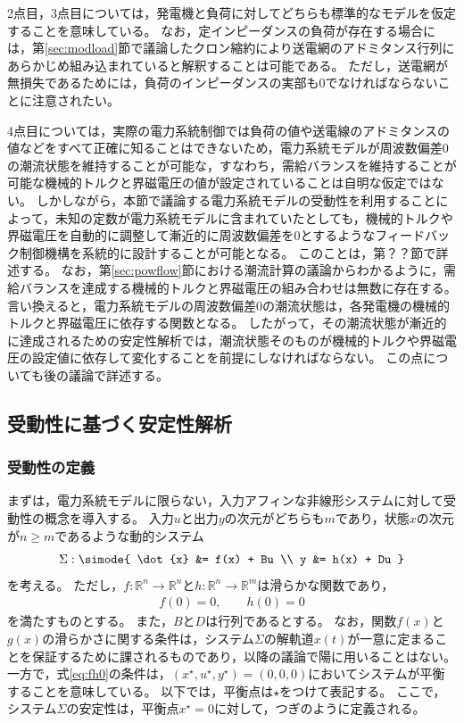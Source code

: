 \documentclass[tombow,dvipdfmx]{corona-a5}
\begin{document}
2点目，3点目については，発電機と負荷に対してどちらも標準的なモデルを仮定することを意味している。
なお，定インピーダンスの負荷が存在する場合には，第\ref{sec:modload}節で議論したクロン縮約により送電網のアドミタンス行列にあらかじめ組み込まれていると解釈することは可能である。
ただし，送電網が無損失であるためには，負荷のインピーダンスの実部も0でなければならないことに注意されたい。

4点目については，実際の電力系統制御では負荷の値や送電線のアドミタンスの値などをすべて正確に知ることはできないため，電力系統モデルが周波数偏差0の潮流状態を維持することが可能な，すなわち，需給バランスを維持することが可能な機械的トルクと界磁電圧の値が設定されていることは自明な仮定ではない。
しかしながら，本節で議論する電力系統モデルの受動性を利用することによって，未知の定数が電力系統モデルに含まれていたとしても，機械的トルクや界磁電圧を自動的に調整して漸近的に周波数偏差を0とするようなフィードバック制御機構を系統的に設計することが可能となる。
このことは，第？？節で詳述する。
なお，第\ref{sec:powflow}節における潮流計算の議論からわかるように，需給バランスを達成する機械的トルクと界磁電圧の組み合わせは無数に存在する。
言い換えると，電力系統モデルの周波数偏差0の潮流状態は，各発電機の機械的トルクと界磁電圧に依存する関数となる。
したがって，その潮流状態が漸近的に達成されるための安定性解析では，潮流状態そのものが機械的トルクや界磁電圧の設定値に依存して変化することを前提にしなければならない。
この点についても後の議論で詳述する。

\subsection{受動性に基づく安定性解析}\label{sec:passstab}

\subsubsection{受動性の定義}

まずは，電力系統モデルに限らない，入力アフィンな非線形システムに対して受動性の概念を導入する。
入力$u$と出力$y$の次元がどちらも$m$であり，状態$x$の次元が$n\geq m$であるような動的システム
\begin{align}\label{eq:nlsig}
\Sigma: \simode{
\dot{x} &= f(x) + Bu \\
y &= h(x) + Du
}
\end{align}
を考える。
ただし，$f:\mathbb{R}^{n} \rightarrow \mathbb{R}^{n}$と$h:\mathbb{R}^{n} \rightarrow \mathbb{R}^{m}$は滑らかな関数であり，
\begin{align}\label{eq:fh0}
f(0)=0,\qquad
h(0)=0
\end{align}
を満たすものとする。
また，$B$と$D$は行列であるとする。
なお，関数$f(x)$と$g(x)$の滑らかさに関する条件は，システム$\Sigma$の解軌道$x(t)$が一意に定まることを保証するために課されるものであり，以降の議論で陽に用いることはない。
一方で，式\ref{eq:fh0}の条件は，$(x^{\star},u^{\star},y^{\star})=(0,0,0)$においてシステムが平衡することを意味している。
以下では，平衡点は$\star$をつけて表記する。
ここで，システム$\Sigma$の安定性は，平衡点$x^{\star}=0$に対して，つぎのように定義される。
\end{document}
